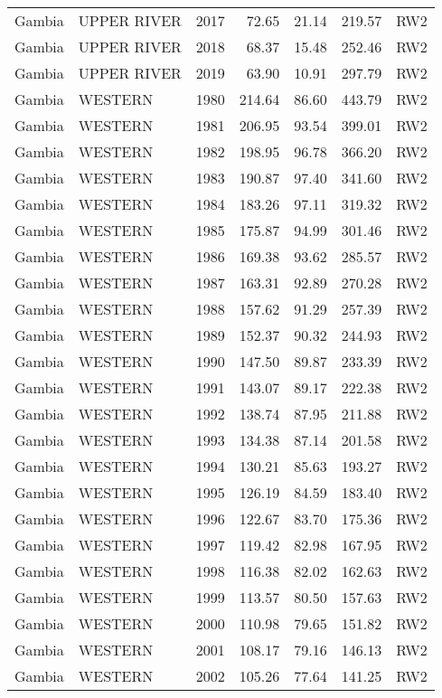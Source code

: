 \begin{longtable}{lllrrrl}
  Gambia & UPPER RIVER & 2017 & 72.65 & 21.14 & 219.57 & RW2 \\ 
  Gambia & UPPER RIVER & 2018 & 68.37 & 15.48 & 252.46 & RW2 \\ 
  Gambia & UPPER RIVER & 2019 & 63.90 & 10.91 & 297.79 & RW2 \\ 
  Gambia & WESTERN & 1980 & 214.64 & 86.60 & 443.79 & RW2 \\ 
  Gambia & WESTERN & 1981 & 206.95 & 93.54 & 399.01 & RW2 \\ 
  Gambia & WESTERN & 1982 & 198.95 & 96.78 & 366.20 & RW2 \\ 
  Gambia & WESTERN & 1983 & 190.87 & 97.40 & 341.60 & RW2 \\ 
  Gambia & WESTERN & 1984 & 183.26 & 97.11 & 319.32 & RW2 \\ 
  Gambia & WESTERN & 1985 & 175.87 & 94.99 & 301.46 & RW2 \\ 
  Gambia & WESTERN & 1986 & 169.38 & 93.62 & 285.57 & RW2 \\ 
  Gambia & WESTERN & 1987 & 163.31 & 92.89 & 270.28 & RW2 \\ 
  Gambia & WESTERN & 1988 & 157.62 & 91.29 & 257.39 & RW2 \\ 
  Gambia & WESTERN & 1989 & 152.37 & 90.32 & 244.93 & RW2 \\ 
  Gambia & WESTERN & 1990 & 147.50 & 89.87 & 233.39 & RW2 \\ 
  Gambia & WESTERN & 1991 & 143.07 & 89.17 & 222.38 & RW2 \\ 
  Gambia & WESTERN & 1992 & 138.74 & 87.95 & 211.88 & RW2 \\ 
  Gambia & WESTERN & 1993 & 134.38 & 87.14 & 201.58 & RW2 \\ 
  Gambia & WESTERN & 1994 & 130.21 & 85.63 & 193.27 & RW2 \\ 
  Gambia & WESTERN & 1995 & 126.19 & 84.59 & 183.40 & RW2 \\ 
  Gambia & WESTERN & 1996 & 122.67 & 83.70 & 175.36 & RW2 \\ 
  Gambia & WESTERN & 1997 & 119.42 & 82.98 & 167.95 & RW2 \\ 
  Gambia & WESTERN & 1998 & 116.38 & 82.02 & 162.63 & RW2 \\ 
  Gambia & WESTERN & 1999 & 113.57 & 80.50 & 157.63 & RW2 \\ 
  Gambia & WESTERN & 2000 & 110.98 & 79.65 & 151.82 & RW2 \\ 
  Gambia & WESTERN & 2001 & 108.17 & 79.16 & 146.13 & RW2 \\ 
  Gambia & WESTERN & 2002 & 105.26 & 77.64 & 141.25 & RW2 \\ 

\end{longtable}
